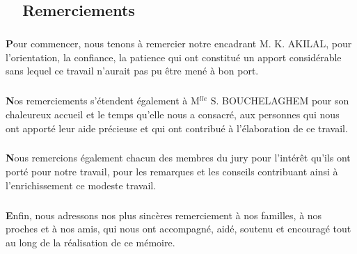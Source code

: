 \begin{titlepage}
\newpage
\pagestyle{fancy}      
\lhead{}  
\chead{}     
\rhead{}     
    
\renewcommand{\headrulewidth}{0.5pt}

\chapter*{\hrulefill ~~\textbf{Remerciements}~ \hrulefill}
\paragraph{}
\paragraph{}
\large

	  \textbf{P}our commencer, nous tenons \`a remercier notre encadrant M. K. AKILAL, pour l'orientation, la confiance, la patience qui ont constitu\'e un apport consid\'erable sans lequel ce travail n'aurait pas pu \^etre men\'e \`a bon port. 
		
		\paragraph{}
			
		\textbf{N}os remerciements s'\'etendent \'egalement \`a M$^{lle}$ S. BOUCHELAGHEM pour son chaleureux accueil  et le temps qu'elle nous a consacr\'e, aux personnes qui nous ont apport\'e leur aide pr\'ecieuse et qui ont contribu\'e \`a l'\'elaboration de ce travail.
		
		\paragraph{}
		
		\textbf{N}ous remercions \'egalement chacun des membres du jury pour l'int\'er\^et qu'ils ont port\'e pour notre travail, pour les remarques et les conseils contribuant ainsi \`a l'enrichissement ce modeste travail.
		
		\paragraph{}
		\textbf{E}nfin, nous adressons nos plus sinc\`eres remerciement \`a nos familles, \`a nos proches et \`a nos amis, qui nous ont accompagn\'e, aid\'e, soutenu et encourag\'e tout au long de la r\'ealisation de ce m\'emoire. 
		
		\paragraph{}
		
		
		
		\paragraph{}
		


\thispagestyle{empty}		

\end{titlepage}	